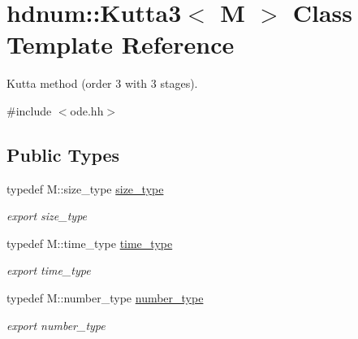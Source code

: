 \hypertarget{classhdnum_1_1Kutta3}{
\section{hdnum::Kutta3$<$ M $>$ Class Template Reference}
\label{classhdnum_1_1Kutta3}
}


Kutta method (order 3 with 3 stages).  




{\ttfamily \#include $<$ode.hh$>$}

\subsection*{Public Types}
\begin{DoxyCompactItemize}
\item 
\hypertarget{classhdnum_1_1Kutta3_aa219675a459b3d48c8ac301a1f6d712b}{
typedef M::size\_\-type \hyperlink{classhdnum_1_1Kutta3_aa219675a459b3d48c8ac301a1f6d712b}{size\_\-type}}
\label{classhdnum_1_1Kutta3_aa219675a459b3d48c8ac301a1f6d712b}

\begin{DoxyCompactList}\small\item\em export size\_\-type \item\end{DoxyCompactList}\item 
\hypertarget{classhdnum_1_1Kutta3_a0055d10b545c5cf60a16fd3a88a6042e}{
typedef M::time\_\-type \hyperlink{classhdnum_1_1Kutta3_a0055d10b545c5cf60a16fd3a88a6042e}{time\_\-type}}
\label{classhdnum_1_1Kutta3_a0055d10b545c5cf60a16fd3a88a6042e}

\begin{DoxyCompactList}\small\item\em export time\_\-type \item\end{DoxyCompactList}\item 
\hypertarget{classhdnum_1_1Kutta3_a06dc1fee934f3a4cbb530f4bc4704b99}{
typedef M::number\_\-type \hyperlink{classhdnum_1_1Kutta3_a06dc1fee934f3a4cbb530f4bc4704b99}{number\_\-type}}
\label{classhdnum_1_1Kutta3_a06dc1fee934f3a4cbb530f4bc4704b99}

\begin{DoxyCompactList}\small\item\em export number\_\-type \item\end{DoxyCompactList}\end{DoxyCompactItemize}
